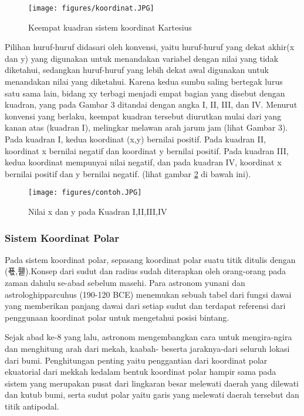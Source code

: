 \begin{figure}[ht]
    \centerline{\texttt{[image: figures/koordinat.JPG]}}
    \caption{Keempat kuadran sistem koordinat Kartesius}
    \label{koordinat}
    \end{figure}

Pilihan huruf-huruf didasari oleh konvensi, yaitu huruf-huruf yang dekat akhir(x dan y) yang digunakan untuk menandakan variabel dengan nilai yang tidak diketahui, sedangkan huruf-huruf yang lebih dekat awal digunakan untuk menandakan nilai yang diketahui. Karena kedua sumbu saling bertegak lurus satu sama lain, bidang xy terbagi menjadi empat bagian yang disebut dengan kuadran, yang pada Gambar 3 ditandai dengan angka I, II, III, dan IV. Menurut konvensi yang berlaku, keempat kuadran tersebut diurutkan mulai dari yang kanan atas (kuadran I), melingkar melawan arah jarum jam (lihat Gambar 3). Pada kuadran I, kedua koordinat (x,y) bernilai positif. Pada kuadran II, koordinat x bernilai negatif dan koordinat y bernilai positif. Pada kuadran III, kedua koordinat mempunyai nilai negatif, dan pada kuadran IV, koordinat x bernilai positif dan y bernilai negatif. (lihat gambar \ref{contoh} di bawah ini).

\begin{figure}[ht]
    \centerline{\texttt{[image: figures/contoh.JPG]}}
    \caption{Nilai x dan y pada Kuadran I,II,III,IV}
    \label{contoh}
    \end{figure}

\subsubsection{Sistem Koordinat Polar}
Pada sistem koordinat polar, sepasang koordinat polar suatu titik ditulis dengan (푟,휃)\cite{mufidah2015solusi}.Konsep dari sudut dan radius sudah diterapkan oleh orang-orang pada zaman dahulu se-abad sebelum masehi. Para astronom yunani dan astrologhipparcuhus (190-120 BCE) menemukan sebuah tabel dari fungsi dawai yang memberikan panjang dawai dari setiap sudut dan terdapat referensi dari penggunaan koordinat polar untuk mengetahui posisi bintang.

Sejak abad ke-8 yang lalu, astronom mengembangkan cara untuk mengira-ngira dan menghitung arah dari mekah, kaabah- beserta jaraknya-dari seluruh lokasi dari bumi. Penghitungan penting yaitu penggantian dari koordinat polar ekuatorial dari mekkah kedalam bentuk koordinat polar hampir sama pada sistem yang merupakan pusat dari lingkaran besar melewati daerah yang dilewati dan kutub bumi, serta sudut polar yaitu garis yang melewati daerah tersebut dan titik antipodal.

